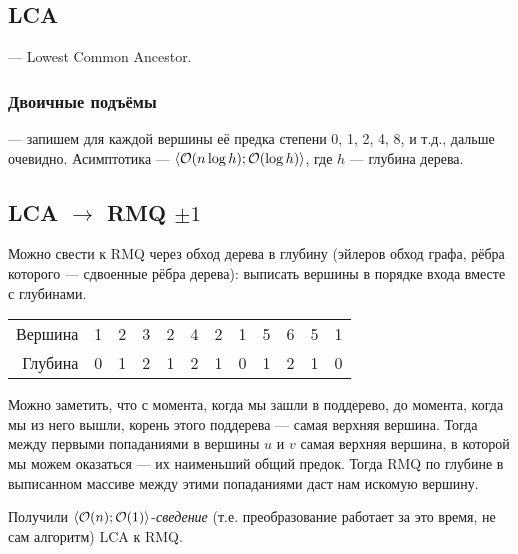 \subsection{LCA}
--- Lowest Common Ancestor.

\subsubsection{Двоичные подъёмы}
--- запишем для каждой вершины
её предка степени 0, 1, 2, 4, 8, и т.д., дальше очевидно.
Асимптотика --- $\langle \mathcal{O}(n \log h); \mathcal{O}(\log h) \rangle$,
где $h$ --- глубина дерева.

\subsection{LCA $\to$ RMQ $\pm 1$}
Можно свести к RMQ через обход дерева в глубину
(эйлеров обход графа, рёбра которого --- сдвоенные рёбра дерева):
выписать вершины в порядке входа вместе с глубинами.

\begin{center}

    \bigskip

    \begin{tabular}{r|ccccccccccc|}
        Вершина & 1 & 2 & 3 & 2 & 4 & 2 & 1 & 5 & 6 & 5 & 1 \\
        Глубина & 0 & 1 & 2 & 1 & 2 & 1 & 0 & 1 & 2 & 1 & 0 \\
    \end{tabular}
\end{center}

Можно заметить, что с момента, когда мы зашли в поддерево,
до момента, когда мы из него вышли, корень этого поддерева
--- самая верхняя вершина.
Тогда между первыми попаданиями в вершины $u$ и $v$
самая верхняя вершина, в которой мы можем оказаться
--- их наименьший общий предок.
Тогда RMQ по глубине в выписанном массиве между этими попаданиями
даст нам искомую вершину.

Получили $\langle \mathcal{O}(n); \mathcal{O}(1) \rangle$-\emph{сведение}
(т.е. преобразование работает за это время, не сам алгоритм)
LCA к RMQ.

